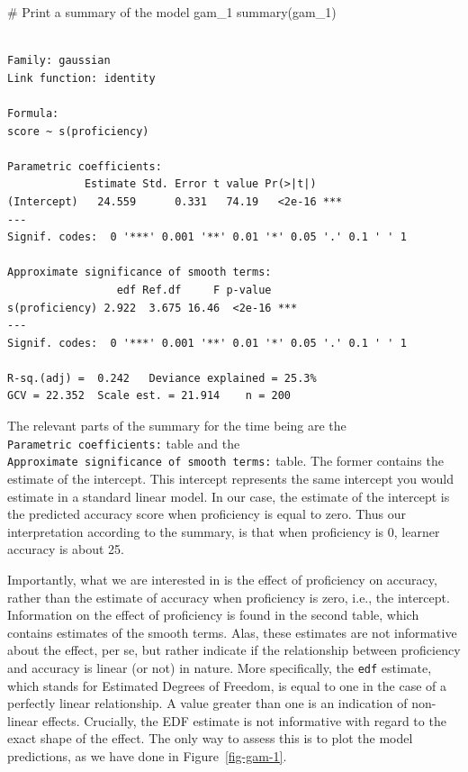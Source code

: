 \documentclass[
  letterpaper,
  DIV=11,
  numbers=noendperiod]{scrartcl}
\newenvironment{Shaded}{\begin{snugshade}}{\end{snugshade}}
\newcommand{\CommentTok}[1]{\textcolor[rgb]{0.37,0.37,0.37}{#1}}
\newcommand{\FunctionTok}[1]{\textcolor[rgb]{0.28,0.35,0.67}{#1}}
\newcommand{\NormalTok}[1]{\textcolor[rgb]{0.00,0.23,0.31}{#1}}
\begin{document}
\begin{Shaded}
\begin{Highlighting}[]
\CommentTok{\# Print a summary of the model \textquotesingle{}gam\_1\textquotesingle{}}
\FunctionTok{summary}\NormalTok{(gam\_1)}
\end{Highlighting}
\end{Shaded}

\begin{verbatim}

Family: gaussian 
Link function: identity 

Formula:
score ~ s(proficiency)

Parametric coefficients:
            Estimate Std. Error t value Pr(>|t|)    
(Intercept)   24.559      0.331   74.19   <2e-16 ***
---
Signif. codes:  0 '***' 0.001 '**' 0.01 '*' 0.05 '.' 0.1 ' ' 1

Approximate significance of smooth terms:
                 edf Ref.df     F p-value    
s(proficiency) 2.922  3.675 16.46  <2e-16 ***
---
Signif. codes:  0 '***' 0.001 '**' 0.01 '*' 0.05 '.' 0.1 ' ' 1

R-sq.(adj) =  0.242   Deviance explained = 25.3%
GCV = 22.352  Scale est. = 21.914    n = 200
\end{verbatim}

The relevant parts of the summary for the time being are the
\texttt{Parametric\ coefficients:} table and the
\texttt{Approximate\ significance\ of\ smooth\ terms:} table. The former
contains the estimate of the intercept. This intercept represents the
same intercept you would estimate in a standard linear model. In our
case, the estimate of the intercept is the predicted accuracy score when
proficiency is equal to zero. Thus our interpretation according to the
summary, is that when proficiency is 0, learner accuracy is about 25.

Importantly, what we are interested in is the effect of proficiency on
accuracy, rather than the estimate of accuracy when proficiency is zero,
i.e., the intercept. Information on the effect of proficiency is found
in the second table, which contains estimates of the smooth terms. Alas,
these estimates are not informative about the effect, per se, but rather
indicate if the relationship between proficiency and accuracy is linear
(or not) in nature. More specifically, the \texttt{edf} estimate, which
stands for Estimated Degrees of Freedom, is equal to one in the case of
a perfectly linear relationship. A value greater than one is an
indication of non-linear effects. Crucially, the EDF estimate is not
informative with regard to the exact shape of the effect. The only way
to assess this is to plot the model predictions, as we have done in
Figure~\ref{fig-gam-1}.
\end{document}
